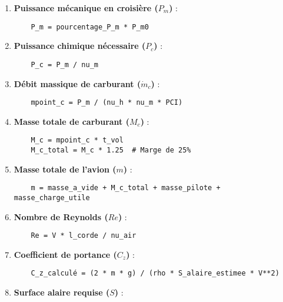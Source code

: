 \documentclass[12pt,a4paper]{article}
\begin{document}
\begin{enumerate}[label=\arabic*.]
    \item \textbf{Puissance mécanique en croisière ($P_m$)} :

    \begin{verbatim}
    P_m = pourcentage_P_m * P_m0
    \end{verbatim}

    \item \textbf{Puissance chimique nécessaire ($P_c$)} :

    \begin{verbatim}
    P_c = P_m / nu_m
    \end{verbatim}

    \item \textbf{Débit massique de carburant ($\dot{m}_c$)} :

    \begin{verbatim}
    mpoint_c = P_m / (nu_h * nu_m * PCI)
    \end{verbatim}

    \item \textbf{Masse totale de carburant ($M_c$)} :

    \begin{verbatim}
    M_c = mpoint_c * t_vol
    M_c_total = M_c * 1.25  # Marge de 25%
    \end{verbatim}

    \item \textbf{Masse totale de l'avion ($m$)} :

    \begin{verbatim}
    m = masse_a_vide + M_c_total + masse_pilote + masse_charge_utile
    \end{verbatim}

    \item \textbf{Nombre de Reynolds ($Re$)} :

    \begin{verbatim}
    Re = V * l_corde / nu_air
    \end{verbatim}

    \item \textbf{Coefficient de portance ($C_z$)} :

    \begin{verbatim}
    C_z_calculé = (2 * m * g) / (rho * S_alaire_estimee * V**2)
    \end{verbatim}

    \item \textbf{Surface alaire requise ($S$)} :


\end{enumerate}
\end{document}
